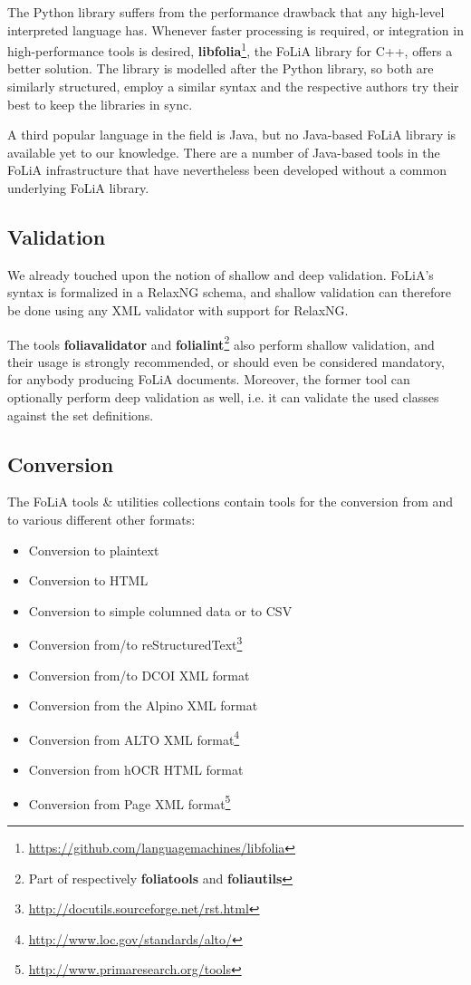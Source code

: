 \documentclass[a4paper,11pt]{article}
\begin{document}
The Python library suffers from the performance drawback that any high-level
interpreted language has. Whenever faster processing is required, or
integration in high-performance tools is desired,
\textbf{libfolia}\footnote{\url{https://github.com/languagemachines/libfolia}}, the
FoLiA library for C++, offers a better solution. The library is modelled after
the Python library, so both are similarly structured, employ a similar syntax
and the respective authors try their best to keep the libraries in sync.

A third popular language in the field is Java, but no Java-based FoLiA
library is available yet to our knowledge. There are a number of
Java-based tools in the FoLiA infrastructure that have nevertheless been developed
without a common underlying FoLiA library.

\subsection{Validation}

We already touched upon the notion of shallow and deep validation.
FoLiA's syntax is formalized in a RelaxNG schema, and shallow validation can
therefore be done using any XML validator with support for RelaxNG. 

The tools \textbf{foliavalidator} and \textbf{folialint}\footnote{Part of
respectively \textbf{foliatools} and \textbf{foliautils}} also perform shallow validation, and
their usage is strongly recommended, or should even be considered mandatory,
for anybody producing FoLiA documents. Moreover, the former tool can optionally perform
deep validation as well, i.e. it can validate the used classes against the set
definitions.

\subsection{Conversion}

The FoLiA tools \& utilities collections contain tools for the conversion from and to
various different other formats:

\begin{itemize}
    \item Conversion to plaintext
    \item Conversion to HTML
    \item Conversion to simple columned data or to CSV
    \item Conversion from/to reStructuredText\footnote{\url{http://docutils.sourceforge.net/rst.html}}
    \item Conversion from/to DCOI XML format \cite{DCOI}
    \item Conversion from the Alpino XML format \cite{ALPINO}
    \item Conversion from ALTO XML format\footnote{\url{http://www.loc.gov/standards/alto/}}
    \item Conversion from hOCR HTML format  \cite{Breuel2007}
    \item Conversion from Page XML format\footnote{\url{http://www.primaresearch.org/tools}}
\end{itemize}
\end{document}
